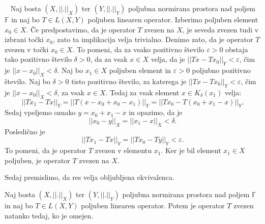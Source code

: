 \documentclass[12pt,a4paper,oneside,fleqn,openany]{book}
\newcommand{\eopf}{\raisebox{0.8ex}{\framebox{}}} %
\newenvironment{dokaz}%
{\noindent{\bf Dokaz.}\ }%
{\hfill\eopf\par\bigskip}%
\newcommand{\F}{\mathbb{F}}
\newcommand{\abs}[1]{\ensuremath{\lvert #1 \rvert}}
\newcommand{\norm}[1]{\abs{\abs{#1}}}
\begin{document}
\begin{dokaz}
	Naj bosta $(X, \norm{.}_X)$ ter $(Y, \norm{.}_Y)$ poljubna normirana prostora nad poljem $\F$ in naj bo $T\in L(X, Y)$ poljuben linearen operator. Izberimo poljuben element $x_0\in X$. Če predpostavimo, da je operator $T$ zvezen na $X$, je seveda zvezen tudi v izbrani točki $x_0$, zato ta implikacija velja trivialno. 
	Denimo zato, da je operator $T$ zvezen v točki $x_0\in X$. To pomeni, da za vsako pozitivno število $\varepsilon>0$ obstaja tako pozitivno število $\delta>0$, da za vsak $x\in X$ velja, da je $\norm{Tx - Tx_0}_Y <\varepsilon$, čim je $\norm{x - x_0}_X<\delta$. Naj bo $x_1\in X$ poljuben element in $\varepsilon>0$ poljubno pozitivno število. Naj bo $\delta>0$ tisto pozitivno število, za katerega je $\norm{Tx - Tx_0}_Y <\varepsilon$, čim je $\norm{x - x_0}_X<\delta$, za vsak $x\in X$. Tedaj za vsak element $x\in K_\delta(x_1)$ velja: $$\norm{Tx_1-Tx}_Y = \norm{T(x-x_0+x_0-x_1)}_Y=\norm{Tx_0 - T(x_0+x_1-x)}_Y.$$ Sedaj vpeljemo oznako $y = x_0 + x_1 - x$ in opazimo, da je $$\norm{x_0 - y}_X = \norm{x_1 - x}_X < \delta.$$ Posledično je $$\norm{Tx_1 - Tx}_Y = \norm{Tx_0 - Ty}_Y < \varepsilon.$$ To pomeni, da je operator $T$ zvezen v elementu $x_1$. Ker je bil element $x_1\in X$ poljuben, je operator $T$ zvezen na $X$.
\end{dokaz}
Sedaj premislimo, da res velja obljubljena ekvivalenca.
\begin{izrek}
	\label{izr:omopzv}
	Naj bosta $(X, \norm{.}_X)$ ter $(Y, \norm{.}_Y)$ poljubna normirana prostora nad poljem $\F$ in naj bo $T\in L(X, Y)$ poljuben linearen operator. Potem je operator $T$ zvezen natanko tedaj, ko je omejen.
\end{izrek}
\end{document}
